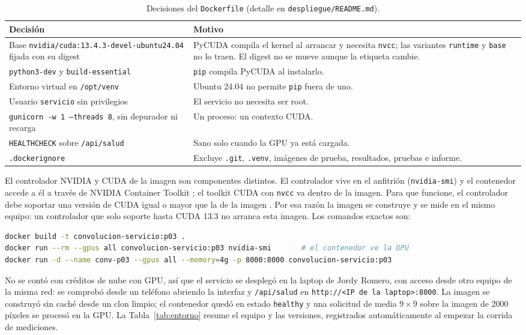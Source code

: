 \documentclass[12pt]{article}
\begin{document}
\begin{table}[H]
\centering
\small
\caption{Decisiones del \texttt{Dockerfile} (detalle en \texttt{despliegue/README.md}).}\label{tab:docker}
\begin{tabular}{p{5.2cm}p{9.3cm}}
\toprule
Decisión & Motivo \\
\midrule
Base \texttt{nvidia/cuda:13.4.3-devel-ubuntu24.04} fijada con su digest & PyCUDA compila el kernel al
arrancar y necesita \texttt{nvcc}; las variantes \texttt{runtime} y \texttt{base} no lo traen. El
digest no se mueve aunque la etiqueta cambie. \\
\texttt{python3-dev} y \texttt{build-essential} & \texttt{pip} compila PyCUDA al instalarlo. \\
Entorno virtual en \texttt{/opt/venv} & Ubuntu 24.04 no permite \texttt{pip} fuera de uno. \\
Usuario \texttt{servicio} sin privilegios & El servicio no necesita ser root. \\
\texttt{gunicorn -w 1 --threads 8}, sin depurador ni recarga & Un proceso: un contexto CUDA. \\
\texttt{HEALTHCHECK} sobre \texttt{/api/salud} & Sano solo cuando la GPU ya está cargada. \\
\texttt{.dockerignore} & Excluye \texttt{.git}, \texttt{.venv}, imágenes de prueba, resultados,
pruebas e informe. \\
\bottomrule
\end{tabular}
\end{table}

El controlador NVIDIA y CUDA de la imagen son componentes distintos. El controlador vive en el
anfitrión (\texttt{nvidia-smi}) y el contenedor accede a él a través de NVIDIA Container Toolkit
\cite{nvidiactk}; el toolkit CUDA con \texttt{nvcc} va dentro de la imagen. Para que funcione, el
controlador debe soportar una versión de CUDA igual o mayor que la de la imagen \cite{cudacompat}. Por
esa razón la imagen se construye y se mide en el mismo equipo: un controlador que solo soporte hasta
CUDA 13.3 no arranca esta imagen. Los comandos exactos son:

\begin{lstlisting}[language=bash]
docker build -t convolucion-servicio:p03 .
docker run --rm --gpus all convolucion-servicio:p03 nvidia-smi       # el contenedor ve la GPU
docker run -d --name conv-p03 --gpus all --memory=4g -p 8000:8000 convolucion-servicio:p03
\end{lstlisting}

No se contó con créditos de nube con GPU, así que el servicio se desplegó en la laptop de Jordy Romero,
con acceso desde otro equipo de la misma red: se comprobó desde un teléfono abriendo la interfaz y
\texttt{/api/salud} en \texttt{http://<IP de la laptop>:8000}. La imagen se construyó sin caché desde
un clon limpio; el contenedor quedó en estado \texttt{healthy} y una solicitud de media $9\times9$
sobre la imagen de 2000 píxeles se procesó en la GPU. La Tabla~\ref{tab:entorno} resume el equipo y
las versiones, registrados automáticamente al empezar la corrida de mediciones.
\end{document}

